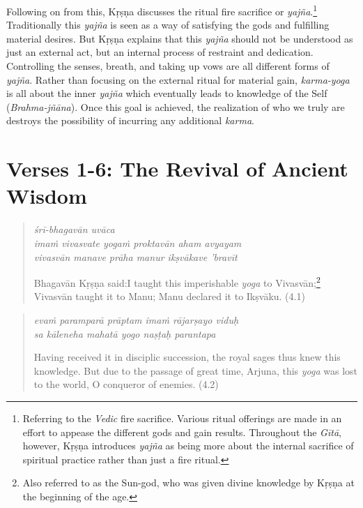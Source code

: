 \documentclass[12pt, twoside, openright]{memoir}
\begin{document}
Following on from this, Kṛṣṇa discusses the ritual fire sacrifice or \textit{yajña}.\footnote{Referring to the \textit{Vedic} fire sacrifice. Various ritual offerings are made in an effort to appease the different gods and gain results. Throughout the \textit{Gītā}, however, Kṛṣṇa introduces \textit{yajña} as being more about the internal sacrifice of spiritual practice rather than just a fire ritual.} Traditionally this \textit{yajña} is seen as a way of satisfying the gods and fulfilling material desires. But Kṛṣṇa explains that this \textit{yajña} should not be understood as just an external act, but an internal process of restraint and dedication. Controlling the senses, breath, and taking up vows are all different forms of \textit{yajña}. Rather than focusing on the external ritual for material gain, \textit{karma-yoga} is all about the inner \textit{yajña} which eventually leads to knowledge of the Self (\textit{Brahma-jñāna}). Once this goal is achieved, the realization of who we truly are destroys the possibility of incurring any additional \textit{karma}.

\newpage
\section{Verses 1-6: The Revival of Ancient Wisdom}\label{sec-verses-1-6-the-revival-of-ancient-wisdom}

\par
\begin{verse}
\textit{śrī-bhagavān uvāca} \\
\textit{imaṁ vivasvate yogaṁ proktavān aham avyayam} \\
\textit{vivasvān manave prāha manur ikṣvākave ’bravīt}

\noindent \quad Bhagavān Kṛṣṇa said:\linebreak I taught this imperishable \textit{yoga} to Vivasvān;\footnote{Also referred to as the Sun-god, who was given divine knowledge by Kṛṣṇa at the beginning of the age.} Vivasvān taught it to Manu; Manu declared it to Ikṣvāku. (4.1)
\end{verse}
\par



\par
\begin{verse}
\textit{evaṁ paramparā prāptam imaṁ rājarṣayo viduḥ} \\
\textit{sa kāleneha mahatā yogo naṣṭaḥ parantapa}

\noindent Having received it in disciplic succession, the royal sages thus knew this knowledge. But due to the passage of great time, Arjuna, this \textit{yoga} was lost to the world, O conqueror of enemies. (4.2)
\end{verse}
\par
\end{document}

